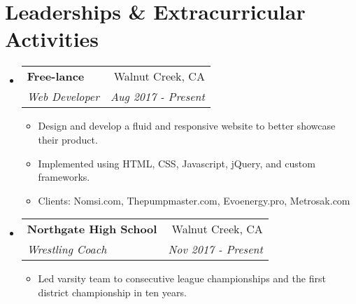 \documentclass[letterpaper,11pt]{article}
\makeatletter
\newcommand{\resumeSubheading}[4]{
  \vspace{-1pt}\item
    \begin{tabular*}{0.97\textwidth}{l@{\extracolsep{\fill}}r}
      \textbf{#1} & #2 \\
      \textit{\small#3} & \textit{\small #4} \\
    \end{tabular*}\vspace{-5pt}
}
\newcommand{\resumeSubHeadingListStart}{\begin{itemize}[leftmargin=*]}
\newcommand{\resumeSubHeadingListEnd}{\end{itemize}}
\makeatother
\begin{document}
\section{Leaderships \& Extracurricular Activities}
\resumeSubHeadingListStart
	\resumeSubheading
	{Free-lance}{Walnut Creek, CA}
	{Web Developer}{Aug 2017 - Present}
	\begin{itemize}
		\item {Design and develop a fluid and responsive website to better showcase their product.}  
		\item {Implemented using HTML, CSS, Javascript, jQuery, and custom frameworks.}  
		\item {Clients: Nomsi.com, Thepumpmaster.com, Evoenergy.pro, Metrosak.com}  
	\end{itemize}
	\resumeSubheading
	{Northgate High School}{Walnut Creek, CA}
	{Wrestling Coach}{Nov 2017 - Present}
	\begin{itemize}
		\item {Led varsity team to consecutive league championships and the first district championship in ten years.}
	\end{itemize}
\resumeSubHeadingListEnd
   


	
\end{document}
